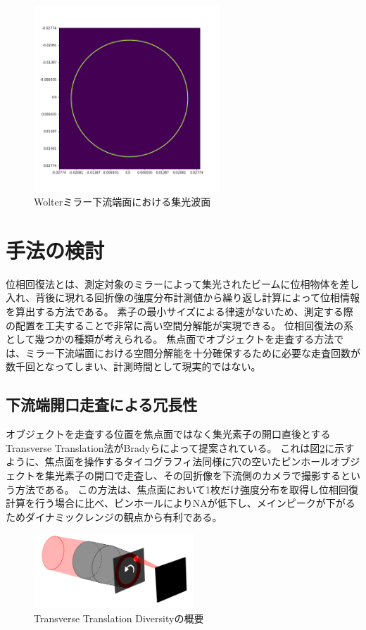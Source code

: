 \documentclass[a4j]{jarticle}
\begin{document}
\begin{figure}[h!]
\centering
\includegraphics[width=7cm]{../thesis/chap1/figure/wolter_thinring.png}
\caption{Wolterミラー下流端面における集光波面}
\label{fig:wolter_thinring}
\end{figure}

\section{手法の検討}

位相回復法とは、測定対象のミラーによって集光されたビームに位相物体を差し入れ、背後に現れる回折像の強度分布計測値から繰り返し計算によって位相情報を算出する方法である。
素子の最小サイズによる律速がないため、測定する際の配置を工夫することで非常に高い空間分解能が実現できる。
位相回復法の系として幾つかの種類が考えられる。
焦点面でオブジェクトを走査する方法では、ミラー下流端面における空間分解能を十分確保するために必要な走査回数が数千回となってしまい、計測時間として現実的ではない。

\subsection{下流端開口走査による冗長性}
\label{chap3_transverse_introduction}

オブジェクトを走査する位置を焦点面ではなく集光素子の開口直後とするTransverse Translation法がBradyらによって提案されている。\cite{Brady2009}
これは図\ref{fig:transverse_schematic}に示すように、焦点面を操作するタイコグラフィ法同様に穴の空いたピンホールオブジェクトを集光素子の開口で走査し、その回折像を下流側のカメラで撮影するという方法である。
この方法は、焦点面において1枚だけ強度分布を取得し位相回復計算を行う場合に比べ、ピンホールによりNAが低下し、メインピークが下がるためダイナミックレンジの観点から有利である。

\begin{figure}[!ht]
\centering
\includegraphics[width=6cm]{../thesis/chap3/figure/transverse_schematic.png}
\caption{Transverse Translation Diversityの概要}
\label{fig:transverse_schematic}
\end{figure}
\end{document}
